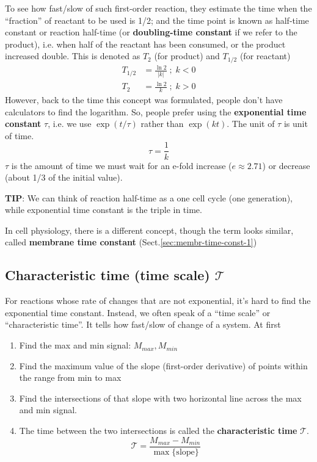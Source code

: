 To see how fast/slow of such first-order reaction, they estimate the time when
the ``fraction'' of reactant to be used is 1/2; and the time point is known as
half-time constant or reaction half-time (or {\bf doubling-time constant} if we
refer to the product), i.e.
when half of the reactant has been consumed, or the product increased double.
This is denoted as $T_2$ (for product) and $T_{1/2}$ (for reactant)
\begin{equation}
  \label{eq:663}
  \begin{split}
    T_{1/2} &= \frac{\ln 2}{|k|}\; ; \; k<0 \\
    T_2 &= \frac{\ln 2}{k}\; ; \; k>0 
  \end{split}
\end{equation}
However, back to the time this concept was formulated, people don't
have calculators to find the logarithm. So, people prefer using the
{\bf exponential time constant} $\tau$, i.e. we use $\exp(t/\tau)$
rather than $\exp(kt)$. The unit of $\tau$ is unit of time.
\begin{equation}
  \label{eq:664}
  \tau = \frac{1}{k}
\end{equation}
$\tau$ is the amount of time we must wait for an e-fold increase
($e\approx 2.71$) or decrease (about 1/3 of the initial value).

\begin{framed}
  {\bf TIP}: We can think of reaction half-time as a one cell cycle (one
  generation), while exponential time constant is the triple in time.
\end{framed}

\begin{framed}
  In cell physiology, there is a different concept, though the term looks
  similar, called {\bf membrane time constant}
  (Sect.\ref{sec:membr-time-const-1}) 
\end{framed}

\subsection{Characteristic time (time scale) $\mathcal{T}$}
\label{sec:char-time-time}

For reactions whose rate of changes that are not exponential, it's hard
to find the exponential time constant. Instead, we often speak of a
``time scale'' or ``characteristic time''. It tells how fast/slow of
change of a system. At first
\begin{enumerate}
\item Find the max and min signal: $M_{max},M_{min}$
\item Find the maximum value of the slope (first-order derivative)
  of points within the range from min to max
\item Find the intersections of that slope with two horizontal line
  across the max and min signal.
\item The time between the two intersections is called the {\bf
    characteristic time} $\mathcal{T}$. 
  \begin{equation}
    \label{eq:665}
    \mathcal{T} = \frac{M_{max}-M_{min}}{\max\{\text{slope}\}} 
  \end{equation}
\end{enumerate}

